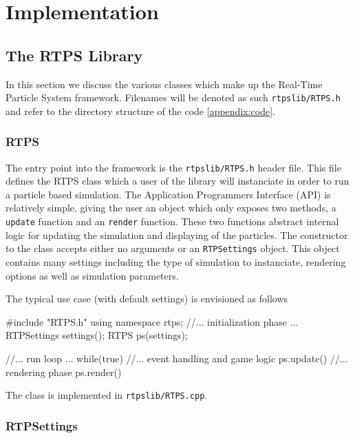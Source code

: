 \chapter{Implementation}

\section{The RTPS Library}

In this section we discuss the various classes which make up the Real-Time
Particle System framework. Filenames will be denoted as such \verb|rtpslib/RTPS.h|
and refer to the directory structure of the code \ref{appendix:code}.



\subsection{RTPS}

The entry point into the framework is the \verb|rtpslib/RTPS.h| header file. This file defines
the RTPS class which a user of the library will instanciate in order to run a
particle based simulation. The Application Programmers Interface (API) is
relatively simple, giving the user an object which only exposes two methods, a
\verb|update| function and an \verb|render| function. These two functions abstract
internal logic for updating the simulation and displaying of the particles. The
constructor to the class accepts either no arguments or an \verb|RTPSettings| object.
This object contains many settings including the type of simulation to
instanciate, rendering options as well as simulation parameters. 

The typical use case (with default settings) is envisioned as follows
\begin{cppcode}{0}
#include "RTPS.h"
using namespace rtps;
//... initialization phase ...
RTPSettings settings();
RTPS ps(settings);

//... run loop ...
while(true)
{
    //... event handling and game logic
    ps.update()
    //... rendering phase
    ps.render()
}

\end{cppcode}

The class is implemented in \verb|rtpslib/RTPS.cpp|.

\subsection{RTPSettings}

